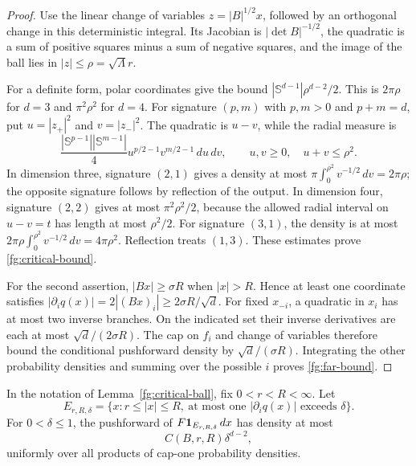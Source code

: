 \begin{proof}
Use the linear change of variables $z=|B|^{1/2}x$, followed
by an orthogonal change in this deterministic integral.
Its Jacobian is $|\det B|^{-1/2}$, the quadratic is a sum
of positive squares minus a sum of negative squares, and
the image of the ball lies in $|z|\leq\rho=\sqrt\Lambda r$.

For a definite form, polar coordinates give the bound
$|\mathbb S^{d-1}|\rho^{d-2}/2$.
This is $2\pi\rho$ for $d=3$ and $\pi^2\rho^2$ for $d=4$.
For signature $(p,m)$ with $p,m>0$ and $p+m=d$, put
$u=|z_+|^2$ and $v=|z_-|^2$.
The quadratic is $u-v$, while the radial measure is
\[
 \frac{|\mathbb S^{p-1}||\mathbb S^{m-1}|}{4}
       u^{p/2-1}v^{m/2-1}\,du\,dv,
 \qquad u,v\geq0,\quad u+v\leq\rho^2 .
\]
In dimension three, signature $(2,1)$ gives a density at
most $\pi\int_0^{\rho^2}v^{-1/2}\,dv=2\pi\rho$;
the opposite signature follows by reflection of the output.
In dimension four, signature $(2,2)$ gives at most
$\pi^2\rho^2/2$, because the allowed radial interval on
$u-v=t$ has length at most $\rho^2/2$.
For signature $(3,1)$, the density is at most
$2\pi\rho\int_0^{\rho^2}v^{-1/2}\,dv=4\pi\rho^2$.
Reflection treats $(1,3)$.  These estimates prove
\eqref{fg:critical-bound}.

For the second assertion, $|Bx|\geq\sigma R$ when $|x|>R$.
Hence at least one coordinate satisfies
$|\partial_iq(x)|=2|(Bx)_i|\geq2\sigma R/\sqrt d$.
For fixed $x_{-i}$, a quadratic in $x_i$ has at most two
inverse branches.  On the indicated set their inverse
derivatives are each at most $\sqrt d/(2\sigma R)$.
The cap on $f_i$ and change of variables therefore bound
the conditional pushforward density by
$\sqrt d/(\sigma R)$.
Integrating the other probability densities and summing
over the possible $i$ proves \eqref{fg:far-bound}.
\end{proof}

\begin{lemma}
\label{fg:thin-tubes}
In the notation of Lemma~\ref{fg:critical-ball}, fix
$0<r<R<\infty$.  Let
\[
 E_{r,R,\delta}
 =\{x:r\leq|x|\leq R,\ 
       \text{at most one }|\partial_iq(x)|\text{ exceeds }\delta\}.
\]
For $0<\delta\leq1$, the pushforward of
$F{\bf1}_{E_{r,R,\delta}}\,dx$ has density at most
\begin{equation}\label{fg:tube-bound}
 C(B,r,R)\delta^{d-2},
\end{equation}
uniformly over all products of cap-one probability densities.
\end{lemma}

